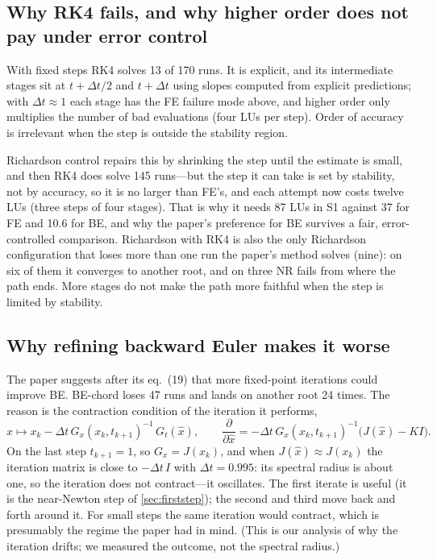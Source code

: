\documentclass[11pt,a4paper]{article}
\begin{document}
\subsection{Why RK4 fails, and why higher order does not pay under error control}
With fixed steps RK4 solves 13 of 170 runs. It is explicit, and its intermediate stages sit at
$t+\Delta t/2$ and $t+\Delta t$ using slopes computed from explicit predictions; with $\Delta t\approx1$ each
stage has the FE failure mode above, and higher order only multiplies the number of bad evaluations (four
LUs per step). Order of accuracy is irrelevant when the step is outside the stability region.

Richardson control repairs this by shrinking the step until the estimate is small, and then RK4 does solve
145 runs---but the step it can take is set by stability, not by accuracy, so it is no larger than FE's, and
each attempt now costs twelve LUs (three steps of four stages). That is why it needs 87 LUs in S1 against 37
for FE and 10.6 for BE, and why the paper's preference for BE survives a fair, error-controlled comparison.
Richardson with RK4 is also the only Richardson configuration that loses more than one run the paper's method
solves (nine): on six of them it converges to another root, and on three NR fails from where the path
ends. More stages do not make the path more faithful when the step is limited by stability.

\subsection{Why refining backward Euler makes it worse}
The paper suggests after its eq.~(19) that more fixed-point iterations could improve BE. BE-chord loses 47
runs and lands on another root 24 times. The reason is the contraction condition of the iteration it performs,
\[
  \hat x \mapsto x_k - \Delta t\,G_x(x_k,t_{k+1})^{-1}\,G_t(\hat x),
  \qquad
  \frac{\partial}{\partial \hat x} = -\Delta t\,G_x(x_k,t_{k+1})^{-1}\bigl(J(\hat x)-KI\bigr).
\]
On the last step $t_{k+1}=1$, so $G_x=J(x_k)$, and when $J(\hat x)\approx J(x_k)$ the iteration matrix is
close to $-\Delta t\,I$ with $\Delta t=0.995$: its spectral radius is about one, so the iteration does not
contract---it oscillates. The first iterate is useful (it is the near-Newton step of \cref{sec:firststep});
the second and third move back and forth around it. For small steps the same iteration would contract,
which is presumably the regime the paper had in mind. (This is our analysis of why the iteration drifts;
we measured the outcome, not the spectral radius.)
\end{document}
